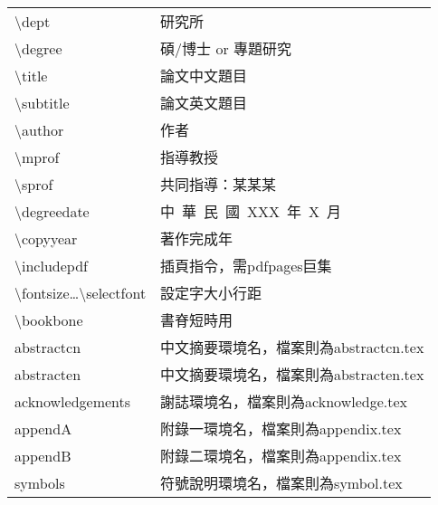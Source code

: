\begin{symbols}
\begin{tabular}{l@{ : }l}
\textbackslash dept & {研究所}           \\[1ex]                         
\textbackslash degree & {碩/博士 or 專題研究}     \\[1ex]                                      
\textbackslash title & {論文中文題目}  \\[1ex]
\textbackslash subtitle & {論文英文題目}  \\[1ex] 
\textbackslash author& 作者             \\[1ex]                                   
\textbackslash mprof&  指導教授          \\[1ex]                  
\textbackslash sprof& 共同指導：某某某  \\[1ex]
\textbackslash degreedate& 中~華~民~國~XXX~年~X~月 \\[1ex]
\textbackslash copyyear& 著作完成年  \\[1ex]
\textbackslash includepdf & 插頁指令，需pdfpages巨集 \\[1ex]
\textbackslash fontsize\ldots\textbackslash selectfont & 設定字大小行距\\[1ex]
\textbackslash bookbone & 書脊短時用\\[1ex]
abstractcn & 中文摘要環境名，檔案則為abstractcn.tex\\[1ex]
abstracten &  中文摘要環境名，檔案則為abstracten.tex\\[1ex]
acknowledge{\color{red}ments} &  謝誌環境名，檔案則為acknowledge.tex\\[1ex]
append{\color {red}A} &  附錄一環境名，檔案則為appendix.tex\\[1ex]
append{\color {red}B} &  附錄二環境名，檔案則為appendix.tex\\[1ex]
symbol{\color {red}s} &  符號說明環境名，檔案則為symbol.tex\\[1ex]
\end{tabular}
\label{symb}
\end{symbols}